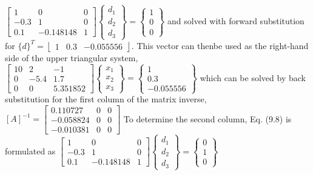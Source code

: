 \documentclass[../main.tex]{subfiles}
\begin{document}
\bigbreak
$\left[\begin{array}{ccc}
1 & 0 & 0 \\
-0.3 & 1 & 0 \\
0.1 & -0.148148 & 1
\end{array}\right]\left\{\begin{array}{l}
d_{1} \\
d_{2} \\
d_{3}
\end{array}\right\}=\left\{\begin{array}{l}
1 \\
0 \\
0
\end{array}\right\}$
\bigbreak
and solved with forward substitution for $\{d\}^{T}=\left\lfloor\begin{array}{lll}1 & 0.3 & -0.055556\end{array}\right\rfloor$. This vector can then\smallbreak  be used as the right-hand side of the upper triangular system,
\bigbreak
$\left[\begin{array}{ccc}
10 & 2 & -1 \\
0 & -5.4 & 1.7 \\
0 & 0 & 5.351852
\end{array}\right]\left\{\begin{array}{l}
x_{1} \\
x_{2} \\
x_{3}
\end{array}\right\}=\left\{\begin{array}{c}
1 \\
0.3 \\
-0.055556
\end{array}\right\}$
\bigbreak
which can be solved by back substitution for the first column of the matrix inverse,
\bigbreak
$[A]^{-1}=\left[\begin{array}{ccc}
0.110727 & 0 & 0 \\
-0.058824 & 0 & 0 \\
-0.010381 & 0 & 0
\end{array}\right]$
\bigbreak
To determine the second column, Eq. (9.8) is formulated as
\bigbreak
$\left[\begin{array}{ccc}
1 & 0 & 0 \\
-0.3 & 1 & 0 \\
0.1 & -0.148148 & 1
\end{array}\right]\left\{\begin{array}{l}
d_{1} \\
d_{2} \\
d_{3}
\end{array}\right\}=\left\{\begin{array}{l}
0 \\
1 \\
0
\end{array}\right\}$
\end{document}
